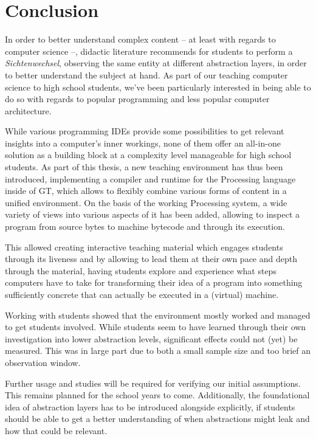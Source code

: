 
\chapter{Conclusion} \label{ch_conclusion}

In order to better understand complex content -- at least with regards to computer science --, didactic literature recommends for students to perform a \emph{Sichtenwechsel}, \ie observing the same entity at different abstraction layers, in order to better understand the subject at hand. As part of our teaching computer science to high school students, we've been particularly interested in being able to do so with regards to popular programming and less popular computer architecture.

While various programming \acp{IDE} provide some possibilities to get relevant insights into a computer's inner workings, none of them offer an all-in-one solution as a building block at a complexity level manageable for high school students. As part of this thesis, a new teaching environment has thus been introduced, implementing a compiler and runtime for the Processing language inside of \acf{GT}, which allows to flexibly combine various forms of content in a unified environment. On the basis of the working Processing system, a wide variety of views into various aspects of it has been added, allowing to inspect a program from source bytes to machine bytecode and through its execution.

This allowed creating interactive teaching material which engages students through its liveness and by allowing to lead them at their own pace and depth through the material, having students explore and experience what steps computers have to take for transforming their idea of a program into something sufficiently concrete that can actually be executed in a (virtual) machine.

Working with students showed that the environment mostly worked and managed to get students involved. While students seem to have learned through their own investigation into lower abstraction levels, significant effects could not (yet) be measured. This was in large part due to both a small sample size and too brief an observation window.

Further usage and studies will be required for verifying our initial assumptions. This remains planned for the school years to come. Additionally, the foundational idea of abstraction layers has to be introduced alongside explicitly, if students should be able to get a better understanding of when abstractions might leak and how that could be relevant.



